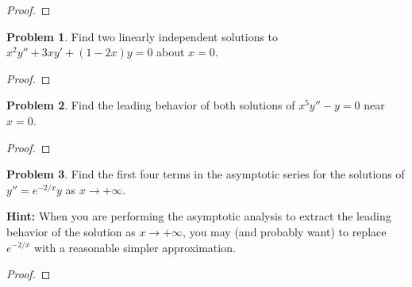 \documentclass[12pt]{article}
\theoremstyle{definition}
\newtheorem{problem}{Problem}
\begin{document}
\begin{proof}
\end{proof}
\newpage


\begin{problem}
  Find two linearly independent solutions to $x^2y'' + 3xy' + (1-2x)y = 0$ about $x=0$.
\end{problem}

\begin{proof}
\end{proof}
\newpage


\begin{problem}
  Find the leading behavior of both solutions of $x^5y'' - y = 0$ near $x=0$.
\end{problem}

\begin{proof}
\end{proof}
\newpage


\begin{problem}
  Find the first four terms in the asymptotic series for the solutions of $y'' = e^{-2/x}y$ as $x\to + \infty$.

  \textbf{Hint:} When you are performing the asymptotic analysis to extract the leading
  behavior of the solution as $x\to  + \infty$, you may (and probably want) to replace
  $e^{-2/x}$ with a reasonable simpler approximation.
\end{problem}

\begin{proof}
\end{proof}
\newpage
\end{document}
